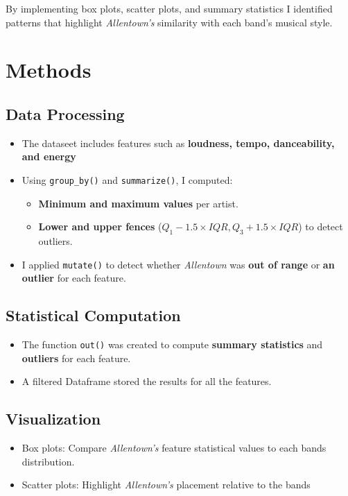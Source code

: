 \documentclass{article}\usepackage[]{graphicx}\usepackage[]{xcolor}
\begin{document}
\begin{multicols}{2}
By implementing box plots, scatter plots, and summary statistics I identified patterns that highlight \textit{Allentown's} similarity with each band's musical style.


\section{Methods}

\subsection{Data Processing}
\begin{itemize}
\item The dataseet includes features such as \textbf{loudness, tempo, danceability, and energy}
\item Using \texttt{group\_by()} and \texttt{summarize()}, I computed:
\begin{itemize}
\item \textbf{Minimum and maximum values} per artist.
\item \textbf{Lower and upper fences} ($Q_1 - 1.5 \times IQR, Q_3 + 1.5 \times IQR$) to detect outliers.
\end{itemize}

\item I applied \texttt{mutate()} to detect whether \textit{Allentown} was \textbf{out of range} or \textbf{an outlier} for each feature.
\end{itemize}

\subsection{Statistical Computation}
\begin{itemize}
\item The function \texttt{out()} was created to compute \textbf{summary statistics} and \textbf{outliers} for each feature.
\item A filtered Dataframe stored the results for all the features.
\end{itemize}

\subsection{Visualization}
\begin{itemize}
\item Box plots: Compare \textit{Allentown's} feature statistical values to each bands distribution.
\item Scatter plots: Highlight \textit{Allentown's} placement relative to the bands
\end{itemize}



\end{multicols}
\end{document}
